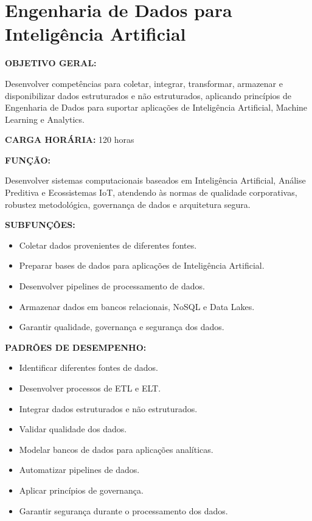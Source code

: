 \section{Engenharia de Dados para Inteligência Artificial}

\textbf{OBJETIVO GERAL:}

Desenvolver competências para coletar, integrar, transformar, armazenar e disponibilizar dados estruturados e não estruturados, aplicando princípios de Engenharia de Dados para suportar aplicações de Inteligência Artificial, Machine Learning e Analytics.

\textbf{CARGA HORÁRIA:} 120 horas

\textbf{FUNÇÃO:}

Desenvolver sistemas computacionais baseados em Inteligência Artificial, Análise Preditiva e Ecossistemas IoT, atendendo às normas de qualidade corporativas, robustez metodológica, governança de dados e arquitetura segura.

\textbf{SUBFUNÇÕES:}

\begin{itemize}
\item Coletar dados provenientes de diferentes fontes.
\item Preparar bases de dados para aplicações de Inteligência Artificial.
\item Desenvolver pipelines de processamento de dados.
\item Armazenar dados em bancos relacionais, NoSQL e Data Lakes.
\item Garantir qualidade, governança e segurança dos dados.
\end{itemize}

\textbf{PADRÕES DE DESEMPENHO:}

\begin{itemize}
\item Identificar diferentes fontes de dados.
\item Desenvolver processos de ETL e ELT.
\item Integrar dados estruturados e não estruturados.
\item Validar qualidade dos dados.
\item Modelar bancos de dados para aplicações analíticas.
\item Automatizar pipelines de dados.
\item Aplicar princípios de governança.
\item Garantir segurança durante o processamento dos dados.
\end{itemize}

